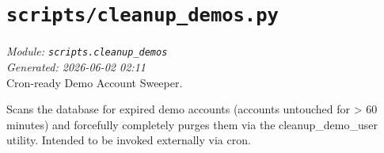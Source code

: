 
\section{\texttt{scripts/cleanup\_demos.py}}
\textit{Module: \texttt{scripts.cleanup\_demos}} \\
\textit{Generated: 2026-06-02 02:11} \\

Cron-ready Demo Account Sweeper.

Scans the database for expired demo accounts (accounts untouched for
\textgreater{} 60 minutes) and forcefully completely purges them via the
cleanup\_demo\_user utility. Intended to be invoked externally via cron.
